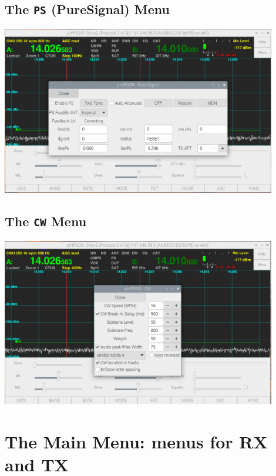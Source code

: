 \documentclass[12pt]{book}
\begin{document}
\section{The \texttt{PS} (PureSignal) Menu}
\begin{center}
\includegraphics[width=12cm]{PSMenu.png}
\end{center}

\section{The \texttt{CW} Menu}
\begin{center}
\includegraphics[width=12cm]{CWMenu.png}
\end{center}

\chapter{The Main Menu: menus for RX and TX}
\end{document}
